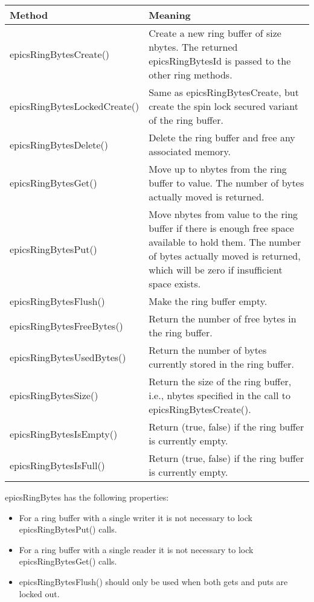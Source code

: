 \begin{center}
\begin{longtable}{p{1.6in}p{5.0in}}
\textbf{Method} & \textbf{Meaning}\\
\hline
epicsRingBytesCreate() & Create a new ring buffer of size nbytes. The returned epicsRingBytesId is passed to the other ring methods.\\
epicsRingBytesLockedCreate() & Same as epicsRingBytesCreate, but create the spin lock secured variant of the ring buffer.\\
epicsRingBytesDelete() & Delete the ring buffer and free any associated memory.\\
epicsRingBytesGet() & Move up to nbytes from the ring buffer to value. The number of bytes actually moved is returned.\\
epicsRingBytesPut() & Move nbytes from value to the ring buffer if there is enough free space available to hold them. The number of bytes actually moved is returned, which will be zero if insufficient space exists.\\
epicsRingBytesFlush() & Make the ring buffer empty.\\
epicsRingBytesFreeBytes() & Return the number of free bytes in the ring buffer.\\
epicsRingBytesUsedBytes() & Return the number of bytes currently stored in the ring buffer.\\
epicsRingBytesSize() & Return the size of the ring buffer, i.e., nbytes specified in the call to epicsRingBytesCreate().\\
epicsRingBytesIsEmpty() & Return (true, false) if the ring buffer is currently empty.\\
epicsRingBytesIsFull() & Return (true, false) if the ring buffer is currently empty.
\end{longtable}

\end{center}


epicsRingBytes has the following properties:

\begin{itemize}
\item For a ring buffer with a single writer it is not necessary to lock epicsRingBytesPut() calls.

\item For a ring buffer with a single reader it is not necessary to lock epicsRingBytesGet() calls.

\item epicsRingBytesFlush() should only be used when both gets and puts are locked out.

\end{itemize}


